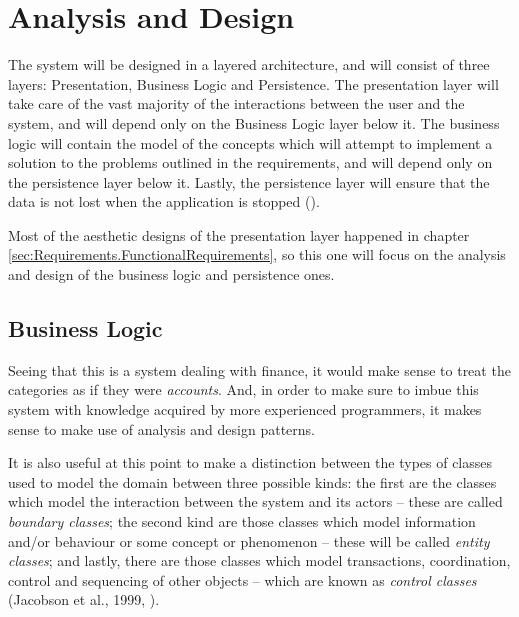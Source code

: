 \section{Analysis and Design} \label{sec:AnalysisAndDesign}

The system will be designed in a layered architecture, and will consist of
three layers: Presentation, Business Logic and Persistence. The presentation
layer will take care of the vast majority of the interactions between the user
and the system, and will depend only on the Business Logic layer below it. The
business logic will contain the model of the concepts which will attempt to
implement a solution to the problems outlined in the requirements, and will
depend only on the persistence layer below it. Lastly, the persistence layer
will ensure that the data is not lost when the application is stopped
(\cite[][p.~32-33]{bauer2016hibernate}).

Most of the aesthetic designs of the presentation layer happened in chapter
\ref{sec:Requirements.FunctionalRequirements}, so this one will focus on the
analysis and design of the business logic and persistence ones.

\subsection{Business Logic} \label{sec:AnalysisAndDesign.BusinessLogic}
Seeing that this is a system dealing with finance, it would make sense to treat
the categories as if they were \emph{accounts}. And, in order to make sure to
imbue this system with knowledge acquired by more experienced programmers, it
makes sense to make use of analysis and design patterns.

It is also useful at this point to make a distinction between the types of
classes used to model the domain between three possible kinds: the first are
the classes which model the interaction between the system and its actors --
these are called \emph{boundary classes}; the second kind are those classes
which model information and/or behaviour or some concept or phenomenon -- these
will be called \emph{entity classes}; and lastly, there are those classes which
model transactions, coordination, control and sequencing of other objects --
which are known as \emph{control classes} (Jacobson et al., 1999,
\cite[cited][pp.~198-201]{bennett2010object}).
%

